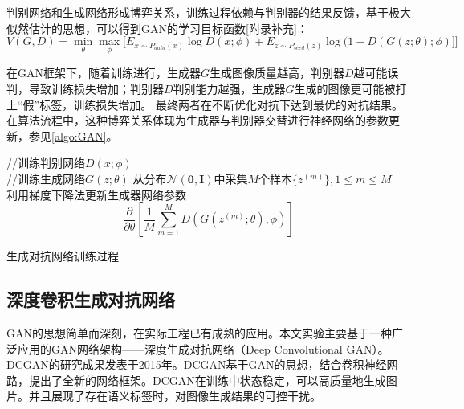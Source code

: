 判别网络和生成网络形成博弈关系，训练过程依赖与判别器的结果反馈，基于极大似然估计的思想，可以得到GAN的学习目标函数[附录补充]：
\begin{equation}
    \label{eq:example-formulas}
    V(G,D)=\underset{\theta}{\min}\underset{\phi}{\max}\Big[E_{x\sim P_{data}(x)}\log D(x;\phi)+E_{z\sim P_{seed}(z)}\log(1-D(G(z;\theta);\phi)]\Big]
\end{equation}

在GAN框架下，随着训练进行，生成器$G$生成图像质量越高，判别器$D$越可能误判，导致训练损失增加；判别器$D$判别能力越强，生成器$G$生成的图像更可能被打上“假”标签，训练损失增加。
最终两者在不断优化对抗下达到最优的对抗结果。在算法流程中，这种博弈关系体现为生成器与判别器交替进行神经网络的参数更新，参见\autoref{algo:GAN}。

\begin{algorithm}[h]
    {
        //训练判别网络$D(x;\phi)$\\
        //训练生成网络$G(z;\theta)$
        从分布$\mathcal{N}(\mathbf{0,I})$中采集$M$个样本$\{z^{(m)}\},1\leq m\leq M$\\
        利用梯度下降法更新生成器网络参数
        \[
        \frac{\partial}{\partial\theta}\left[\frac{1}{M}\sum_{m=1}^M D(G(z^{(m)};\theta),\phi)\right]
        \]
    }
    \caption{生成对抗网络训练过程}
    \label{algo:GAN}
\end{algorithm}

\subsection{深度卷积生成对抗网络}
GAN的思想简单而深刻，在实际工程已有成熟的应用。本文实验主要基于一种广泛应用的GAN网络架构——深度生成对抗网络（Deep Convolutional GAN）。
DCGAN的研究成果\cite{radford2015unsupervised}发表于2015年。DCGAN基于GAN的思想，结合卷积神经网路，提出了全新的网络框架。DCGAN在训练中状态稳定，可以高质量地生成图片。并且展现了存在语义标签时，对图像生成结果的可控干扰。

